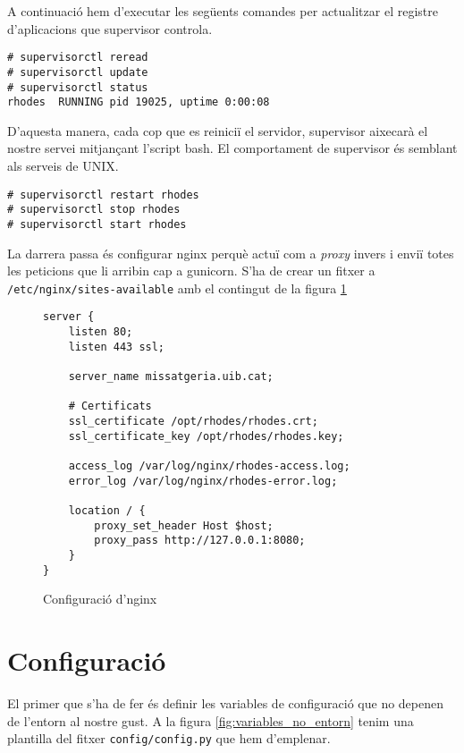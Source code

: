 A continuació hem d'executar les següents comandes per actualitzar el registre d'aplicacions que supervisor controla.
\begin{verbatim}
# supervisorctl reread
# supervisorctl update
# supervisorctl status
rhodes	RUNNING	pid 19025, uptime 0:00:08
\end{verbatim}

D'aquesta manera, cada cop que es reiniciï el servidor, supervisor aixecarà el nostre servei mitjançant l'script bash. El comportament de supervisor és semblant als serveis de UNIX.

\begin{verbatim}
# supervisorctl restart rhodes
# supervisorctl stop rhodes
# supervisorctl start rhodes
\end{verbatim}

La darrera passa és configurar nginx perquè actuï com a \emph{proxy} invers i enviï totes les peticions que li arribin cap a gunicorn. S'ha de crear un fitxer a \texttt{/etc/nginx/sites-available} amb el contingut de la figura \ref{fig:nginx}

\begin{figure}[h!]
	\begin{verbatim}
server {
    listen 80;
    listen 443 ssl;
	
    server_name missatgeria.uib.cat;

    # Certificats
    ssl_certificate /opt/rhodes/rhodes.crt;
    ssl_certificate_key /opt/rhodes/rhodes.key;
    
    access_log /var/log/nginx/rhodes-access.log;
    error_log /var/log/nginx/rhodes-error.log;

    location / {
        proxy_set_header Host $host;
        proxy_pass http://127.0.0.1:8080;
    }
}
	\end{verbatim}
	\caption{Configuració d'nginx}
	\label{fig:nginx}
\end{figure}
\section{Configuració}
El primer que s'ha de fer és definir les variables de configuració que no depenen de l'entorn al nostre gust. A la figura \ref{fig:variables_no_entorn} tenim una plantilla del fitxer \texttt{config/config.py} que hem d'emplenar.\\

